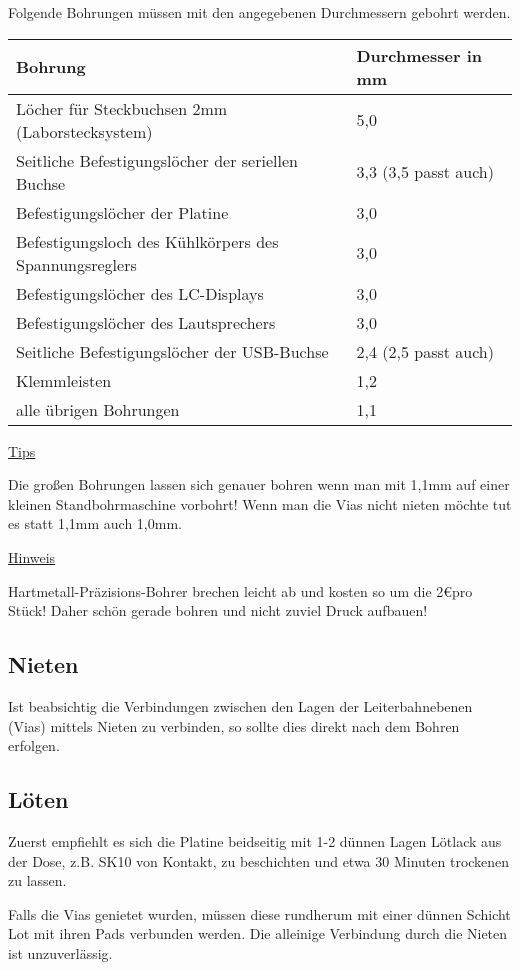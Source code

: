 \documentclass[a4paper]{article}
\begin{document}
Folgende Bohrungen müssen mit den angegebenen Durchmessern gebohrt werden.

\begin{tabular}{ll}
	\hline
	\textbf{Bohrung} & \textbf{Durchmesser in mm} \\
	\hline
Löcher für Steckbuchsen 2mm (Laborstecksystem) & 5,0 \\
Seitliche Befestigungslöcher der seriellen Buchse & 3,3 (3,5 passt auch) \\
Befestigungslöcher der Platine & 3,0 \\
Befestigungsloch des Kühlkörpers des Spannungsreglers & 3,0 \\
Befestigungslöcher des LC-Displays & 3,0 \\
Befestigungslöcher des Lautsprechers & 3,0 \\
Seitliche Befestigungslöcher der USB-Buchse & 2,4 (2,5 passt auch) \\
Klemmleisten & 1,2 \\
alle übrigen Bohrungen & 1,1 \\
	\hline
\end{tabular}

\underline{Tips}

Die großen Bohrungen lassen sich genauer bohren wenn man mit 1,1mm auf einer kleinen Standbohrmaschine vorbohrt! Wenn man die Vias nicht nieten möchte tut es statt 1,1mm auch 1,0mm.

\underline{Hinweis}

Hartmetall-Präzisions-Bohrer brechen leicht ab und kosten so um die 2\euro pro Stück! Daher schön gerade bohren und nicht zuviel Druck aufbauen!

\subsection{Nieten}

Ist beabsichtig die Verbindungen zwischen den Lagen der Leiterbahnebenen (Vias) mittels Nieten zu verbinden, so sollte dies direkt nach dem Bohren erfolgen.

\subsection{Löten}

Zuerst empfiehlt es sich die Platine beidseitig mit 1-2 dünnen Lagen Lötlack aus der Dose, z.B. SK10 von Kontakt, zu beschichten und etwa 30 Minuten trockenen zu lassen.

Falls die Vias genietet wurden, müssen diese rundherum mit einer dünnen Schicht Lot mit ihren Pads verbunden werden. Die alleinige Verbindung durch die Nieten ist unzuverlässig.
\end{document}
